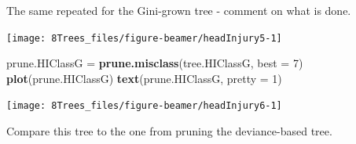 \documentclass[10pt,ignorenonframetext,]{beamer}
\newenvironment{Shaded}{\begin{snugshade}}{\end{snugshade}}
\newcommand{\KeywordTok}[1]{\textcolor[rgb]{0.13,0.29,0.53}{\textbf{#1}}}
\newcommand{\DataTypeTok}[1]{\textcolor[rgb]{0.13,0.29,0.53}{#1}}
\newcommand{\DecValTok}[1]{\textcolor[rgb]{0.00,0.00,0.81}{#1}}
\newcommand{\StringTok}[1]{\textcolor[rgb]{0.31,0.60,0.02}{#1}}
\newcommand{\OperatorTok}[1]{\textcolor[rgb]{0.81,0.36,0.00}{\textbf{#1}}}
\newcommand{\NormalTok}[1]{#1}
\begin{document}
\begin{frame}[fragile]

The same repeated for the Gini-grown tree - comment on what is done.

\scriptsize

\begin{Shaded}
\end{Shaded}

\begin{center}\texttt{[image: 8Trees\_files/figure-beamer/headInjury5-1]} \end{center}

\end{frame}

\begin{frame}[fragile]

\scriptsize

\begin{Shaded}
\begin{Highlighting}[]
\NormalTok{prune.HIClassG =}\StringTok{ }\KeywordTok{prune.misclass}\NormalTok{(tree.HIClassG, }\DataTypeTok{best =} \DecValTok{7}\NormalTok{)}
\KeywordTok{plot}\NormalTok{(prune.HIClassG)}
\KeywordTok{text}\NormalTok{(prune.HIClassG, }\DataTypeTok{pretty =} \DecValTok{1}\NormalTok{)}
\end{Highlighting}
\end{Shaded}

\begin{center}\texttt{[image: 8Trees\_files/figure-beamer/headInjury6-1]} \end{center}

\normalsize

Compare this tree to the one from pruning the deviance-based tree.

\end{frame}
\end{document}
